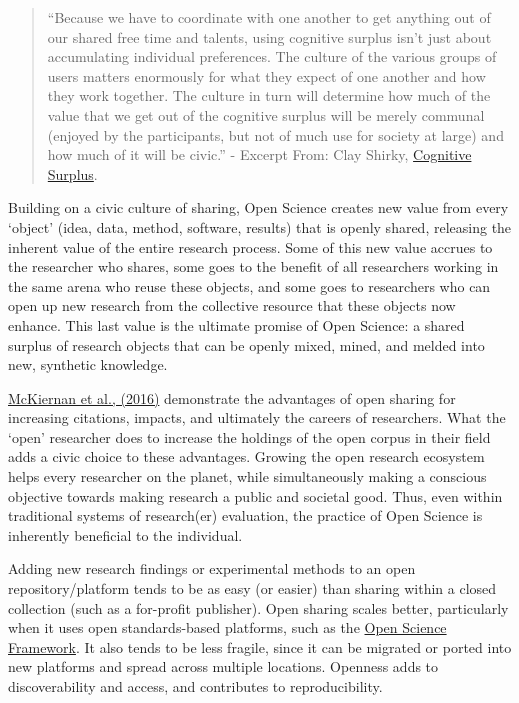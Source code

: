 \documentclass[]{book}
\begin{document}
\begin{quote}
``Because we have to coordinate with one another to get anything out of our shared free time and talents, using cognitive surplus isn't just about accumulating individual preferences. The culture of the various groups of users matters enormously for what they expect of one another and how they work together. The culture in turn will determine how much of the value that we get out of the cognitive surplus will be merely communal (enjoyed by the participants, but not of much use for society at large) and how much of it will be civic.'' - Excerpt From: Clay Shirky, \href{https://en.wikipedia.org/wiki/Cognitive_Surplus}{Cognitive Surplus}.
\end{quote}

Building on a civic culture of sharing, Open Science creates new value from every `object' (idea, data, method, software, results) that is openly shared, releasing the inherent value of the entire research process. Some of this new value accrues to the researcher who shares, some goes to the benefit of all researchers working in the same arena who reuse these objects, and some goes to researchers who can open up new research from the collective resource that these objects now enhance. This last value is the ultimate promise of Open Science: a shared surplus of research objects that can be openly mixed, mined, and melded into new, synthetic knowledge.

\href{https://elifesciences.org/articles/16800}{McKiernan et al., (2016)} demonstrate the advantages of open sharing for increasing citations, impacts, and ultimately the careers of researchers. What the `open' researcher does to increase the holdings of the open corpus in their field adds a civic choice to these advantages. Growing the open research ecosystem helps every researcher on the planet, while simultaneously making a conscious objective towards making research a public and societal good. Thus, even within traditional systems of research(er) evaluation, the practice of Open Science is inherently beneficial to the individual.

Adding new research findings or experimental methods to an open repository/platform tends to be as easy (or easier) than sharing within a closed collection (such as a for-profit publisher). Open sharing scales better, particularly when it uses open standards-based platforms, such as the \href{https://osf.io/}{Open Science Framework}. It also tends to be less fragile, since it can be migrated or ported into new platforms and spread across multiple locations. Openness adds to discoverability and access, and contributes to reproducibility.
\end{document}

